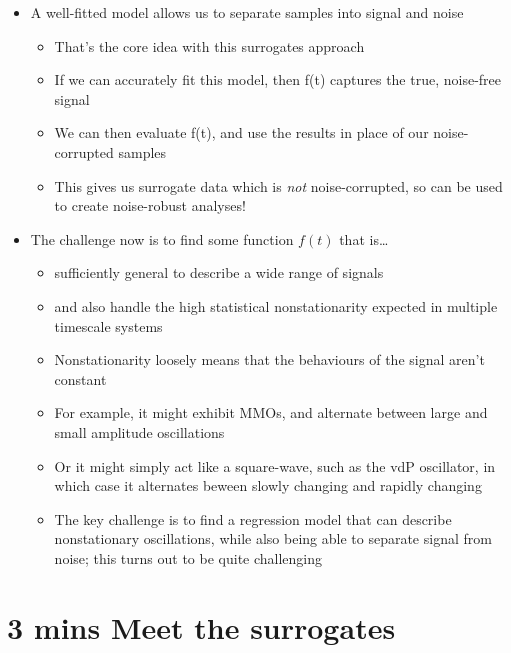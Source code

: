 \documentclass[11pt]{article}
\begin{document}
\begin{itemize}
\item A well-fitted model allows us to separate samples into signal and noise
\begin{itemize}
\item ​That's the core idea with this surrogates approach
\item If we can accurately fit this model, then f(t) captures the true, noise-free signal
\item We can then evaluate f(t), and use the results in place of our noise-corrupted samples
\item This gives us surrogate data which is \emph{not} noise-corrupted, so can be used to create noise-robust analyses!
\end{itemize}

\item The challenge now is to find some function \(f(t)\) that is\ldots{}
\begin{itemize}
\item sufficiently general to describe a wide range of signals
\item and also handle the high statistical nonstationarity expected in multiple timescale systems

\item Nonstationarity loosely means that the behaviours of the signal aren't constant
\item For example, it might exhibit MMOs, and alternate between large and small amplitude oscillations
\item Or it might simply act like a square-wave, such as the vdP oscillator, in which case it alternates beween slowly changing and rapidly changing
\item The key challenge is to find a regression model that can describe nonstationary oscillations, while also being able to separate signal from noise; this turns out to be quite challenging
\end{itemize}
\end{itemize}

\section{3 mins Meet the surrogates}
\label{sec:orgc4d59ce}
\end{document}
